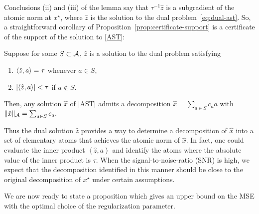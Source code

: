 Conclusions (ii) and (iii) of the lemma say that $\tau^{-1}\hat{z}$ is a
subgradient of the atomic norm at $x^\star$, where $\hat{z}$ is the solution to
the dual problem~\eqref{eq:dual-ast}. So, a straightforward corollary of
Proposition~\ref{prop:certificate-support} is a certificate of the support of
the solution to \eqref{AST}:

\begin{corollary}
\label{cor:dual-cert-support}

Suppose for some $S \subset \mathcal{A}$,  $\hat{z}$ is a solution to the dual problem  satisfying
\begin{enumerate}
\item $\langle\hat{z}, a\rangle = \tau$ whenever $a \in S,$
\item $|\langle\hat{z}, a\rangle| < \tau$ if $a \not\in S.$
\end{enumerate}
Then, any solution $\hat{x}$ of \eqref{AST} admits a decomposition $\hat{x} =
\sum_{a \in S}{c_a a}$ with $\lVert\hat{x}\rVert_{\mathcal{A}} = \sum_{a \in S}{c_a}.$
\end{corollary}

Thus the dual solution $\hat{z}$ provides a way to determine a decomposition of
$\hat{x}$ into a set of elementary atoms that achieves the atomic norm of
$\hat{x}$. In fact, one could evaluate the inner product $\left<\hat{z},
a\right>$ and identify the atoms where the absolute value of the inner product
is $\tau$. When the signal-to-noise-ratio (SNR) is high, we expect that the
decomposition identified in this manner should be close to the original
decomposition of $x^\star$ under certain assumptions.

We are now ready to state a proposition which gives an upper bound on the MSE
with the optimal choice of the regularization parameter.

